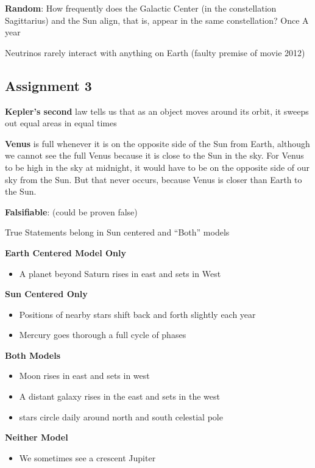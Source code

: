 \documentclass[12pt]{article}
\begin{document}
{\bf Random}: How frequently does the Galactic Center (in the constellation Sagittarius) and the Sun align, that is, appear in the same constellation? Once A year

Neutrinos rarely interact with anything on Earth (faulty premise of movie 2012)

\subsection{Assignment 3}
{\bf Kepler's second} law tells us that as an object moves around its orbit, it sweeps out equal areas in equal times

{\bf Venus} is full whenever it is on the opposite side of the Sun from Earth, although we cannot see the full Venus because it is close to the Sun in the sky. For Venus to be high in the sky at midnight, it would have to be on the opposite side of our sky from the Sun. But that never occurs, because Venus is closer than Earth to the Sun.

{\bf Falsifiable}: (could be proven false)

True Statements belong in Sun centered and ``Both'' models

{\bf Earth Centered Model Only}
\begin{itemize}
\item A planet beyond Saturn rises in east and sets in West
\end{itemize}

{\bf Sun Centered Only}
\begin{itemize}
\item Positions of nearby stars shift back and forth slightly each year
\item Mercury goes thorough a full cycle of phases
\end{itemize}

{\bf Both Models}
\begin{itemize}
\item Moon rises in east and sets in west
\item A distant galaxy rises in the east and sets in the west
\item stars circle daily around north and south celestial pole
\end{itemize}

{\bf Neither Model}
\begin{itemize}
\item We sometimes see a crescent Jupiter
\end{itemize}
\end{document}
